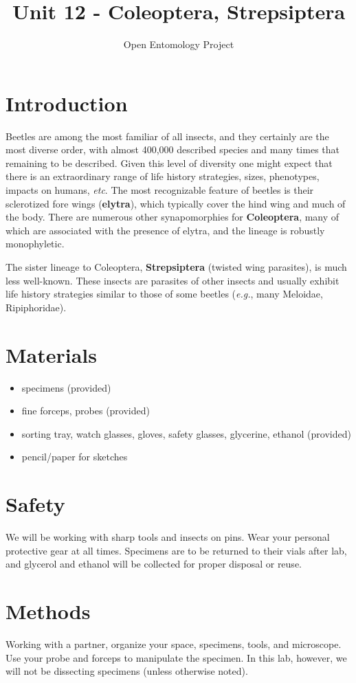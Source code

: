 \documentclass[letterpaper, 11pt]{article}
\title{Unit 12 - Coleoptera, Strepsiptera}
\author{Open Entomology Project}
\begin{document}
\cleanlookdateon %
\maketitle
\thispagestyle{fancy}
\section*{Introduction}
Beetles are among the most familiar of all insects, and they certainly are the most diverse order, with almost 400,000 described species and many times that remaining to be described. Given this level of diversity one might expect that there is an extraordinary range of life history strategies, sizes, phenotypes, impacts on humans, \textit{etc}. The most recognizable feature of beetles is their sclerotized fore wings (\textbf{elytra}), which typically cover the hind wing and much of the body. There are numerous other synapomorphies for \textbf{Coleoptera}, many of which are associated with the presence of elytra, and the lineage is robustly monophyletic. 

The sister lineage to Coleoptera, \textbf{Strepsiptera} (twisted wing parasites), is much less well-known. These insects are parasites of other insects and usually exhibit life history strategies similar to those of some beetles (\textit{e.g.}, many Meloidae, Ripiphoridae).

\section*{Materials}
\begin{itemize}
\item specimens (provided)
\item fine forceps, probes (provided)
\item sorting tray, watch glasses, gloves, safety glasses, glycerine, ethanol (provided)
\item pencil/paper for sketches
\end{itemize}

\section*{Safety}
We will be working with sharp tools and insects on pins. Wear your personal protective gear at all times. Specimens are to be returned to their vials after lab, and glycerol and ethanol will be collected for proper disposal or reuse.

\section*{Methods}
Working with a partner, organize your space, specimens, tools, and microscope. Use your probe and forceps to manipulate the specimen. In this lab, however, we will not be dissecting specimens (unless otherwise noted).
\end{document}
